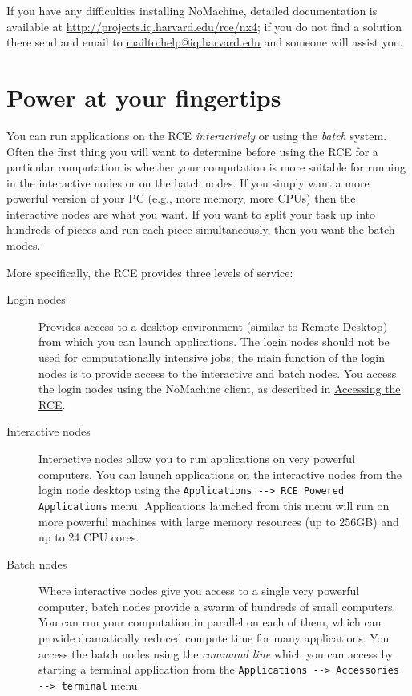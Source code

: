 \documentclass[11pt]{article}
\begin{document}
If you have any difficulties installing NoMachine, detailed documentation is available at \url{http://projects.iq.harvard.edu/rce/nx4}; if you do not find a solution there send and email to \url{mailto:help@iq.harvard.edu} and someone will assist you.

\section{Power at your fingertips}
\label{sec-3}

You can run applications on the RCE \emph{interactively} or using the \emph{batch} system. Often the first thing you will want to determine before using the RCE for a particular computation is whether your computation is more suitable for running in the interactive nodes or on the batch nodes. If you simply want a more powerful version of your PC (e.g., more memory, more CPUs) then the interactive nodes are what you want. If you want to split your task up into hundreds of pieces and run each piece simultaneously, then you want the batch modes.

More specifically, the RCE provides three levels of service:
\begin{description}
\item[{Login nodes}] Provides access to a desktop environment (similar to Remote Desktop) from which you can launch applications. The login nodes should not be used for computationally intensive jobs; the main function of the login nodes is to provide access to the interactive and batch nodes. You access the login nodes using the NoMachine client, as described in \hyperref[sec-2]{Accessing the RCE}.
\item[{Interactive nodes}] Interactive nodes allow you to run applications on very powerful computers. You can launch applications on the interactive nodes from the login node desktop using the \texttt{Applications -{}-> RCE Powered Applications} menu. Applications launched from this menu will run on more powerful machines with large memory resources (up to 256GB) and up to 24 CPU cores.
\item[{Batch nodes}] Where interactive nodes give you access to a single very powerful computer, batch nodes provide a swarm of hundreds of small computers. You can run your computation in parallel on each of them, which can provide dramatically reduced compute time for many applications. You access the batch nodes using the \emph{command line} which you can access by starting a terminal application from the  \texttt{Applications -{}-> Accessories -{}-> terminal} menu.
\end{description}
\end{document}
